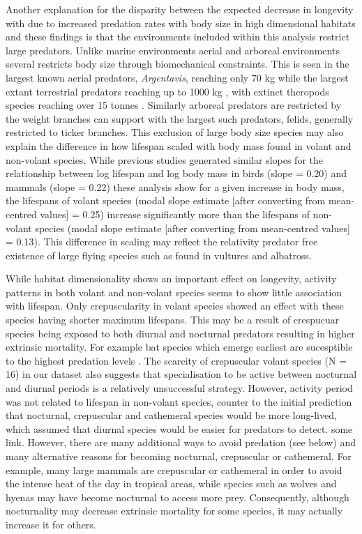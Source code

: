 Another explanation for the disparity between the expected decrease in longevity with due to increased predation rates with body size in high dimensional habitats \citep{pawar2012dimensionality} and these findings is that the environments included within this analysis restrict large predators. Unlike marine environments aerial and arboreal environments several restricts body size through biomechanical constraints. This is seen in the largest known aerial predators, \textit{Argentavis}, reaching only 70 kg \citep{chatterjee2007aerodynamics} while the largest extant terrestrial predators reaching up to 1000 kg \citep{carwardine1995guinness}, with extinct theropods species reaching over 15 tonnes \citep{therrien2007my}. Similarly arboreal predators are restricted by the weight branches can support with the largest such predators, felids, generally restricted to ticker branches. This exclusion of large body size species may also explain the difference in how lifespan scaled with body mass found in volant and non-volant species. While previous studies generated similar slopes for the relationship between log lifespan and log body mass in birds (slope = 0.20) and mammals (slope = 0.22) \citep{lindstedt1981body,hulbert2007life} these analysis show for a given increase in body mass, the lifespans of volant species (modal slope estimate [after converting from mean-centred values] = 0.25) increase significantly more than the lifespans of non-volant species (modal slope estimate [after converting from mean-centred values] = 0.13). This difference in scaling may reflect the relativity predator free existence of large flying species such as found in vultures and albatross.


While habitat dimensionality shows an important effect on longevity, activity patterns in both volant and non-volant species seems to show little association with lifespan. Only crepuscularity in volant species showed an effect with these species having shorter maximum lifespans. This may be a result of crespucuar species being exposed to both diurnal and nocturnal predators resulting in higher extrinsic mortality. For example bat species which emerge earliest are sucesptible to the highest predation levels \citep{jones1994foraging}. The scarcity of crepuscular volant species (N = 16) in our dataset also suggests that specialisation to be active between nocturnal and diurnal periods is a relatively unsuccessful strategy. However, activity period was not related to lifespan in non-volant species, counter to the initial prediction that nocturnal, crepuscular and cathemeral species would be more long-lived, which assumed that diurnal species would be easier for predators to detect. some link. However, there are many additional ways to avoid predation (see below) and many alternative reasons for becoming nocturnal, crepuscular or cathemeral. For example, many large mammals are crepuscular or cathemeral in order to avoid the intense heat of the day in tropical areas, while species such as wolves and hyenas may have become nocturnal to access more prey. Consequently, although nocturnality may decrease extrinsic mortality for some species, it may actually increase it for others.


